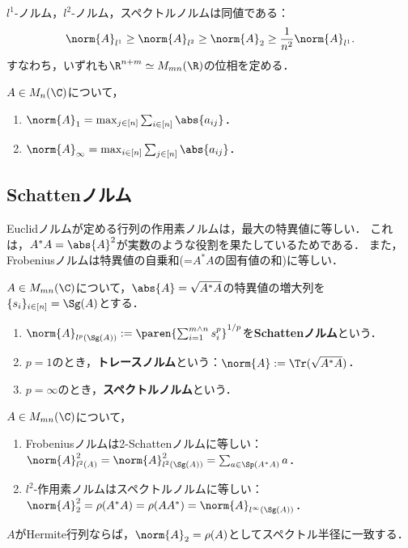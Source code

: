 \documentclass[uplatex, dvipdfmx]{jsreport}
\begin{document}
\begin{proposition}[ノルムの同値性]
    $l^1$-ノルム，$l^2$-ノルム，スペクトルノルムは同値である：
    \[\norm{A}_{l^1}\ge\norm{A}_{l^2}\ge\norm{A}_2\ge\frac{1}{n^2}\norm{A}_{l^1}.\]
    すなわち，いずれも$\R^{n+m}\simeq M_{mn}(\R)$の位相を定める．
\end{proposition}

\begin{proposition}[作用素ノルムの表示]
    $A\in M_n(\C)$について，
    \begin{enumerate}
        \item $\norm{A}_1=\max_{j\in[n]}\sum_{i\in[n]}\abs{a_{ij}}$．
        \item $\norm{A}_\infty=\max_{i\in[n]}\sum_{j\in[n]}\abs{a_{ij}}$．
    \end{enumerate}
\end{proposition}

\subsection{Schattenノルム}

\begin{tcolorbox}[colframe=ForestGreen, colback=ForestGreen!10!white,breakable,colbacktitle=ForestGreen!40!white,coltitle=black,fonttitle=\bfseries\sffamily,
title=]
    Euclidノルムが定める行列の作用素ノルムは，最大の特異値に等しい．
    これは，$A^*A=\abs{A}^2$が実数のような役割を果たしているためである．
    また，Frobeniusノルムは特異値の自乗和(=$A^*A$の固有値の和)に等しい．
\end{tcolorbox}

\begin{definition}
    $A\in M_{mn}(\C)$について，$\abs{A}=\sqrt{A^*A}$の特異値の増大列を$\{s_i\}_{i\in[n]}=\Sg(A)$とする．
    \begin{enumerate}
        \item $\norm{A}_{l^p(\Sg(A))}:=\paren{\sum_{i=1}^{m\land n}s_i^p}^{1/p}$を\textbf{Schattenノルム}という．
        \item $p=1$のとき，\textbf{トレースノルム}という：$\norm{A}:=\Tr(\sqrt{A^*A})$．
        \item $p=\infty$のとき，\textbf{スペクトルノルム}という．
    \end{enumerate}
\end{definition}

\begin{proposition}
    $A\in M_{mn}(\C)$について，
    \begin{enumerate}
        \item Frobeniusノルムは2-Schattenノルムに等しい：$\norm{A}_{l^2(A)}^2=\norm{A}_{l^2(\Sg(A))}^2=\sum_{a\in\Sp(A^*A)}a$．
        \item $l^2$-作用素ノルムはスペクトルノルムに等しい：$\norm{A}_{2}^2=\rho(A^*A)=\rho(AA^*)=\norm{A}_{l^\infty(\Sg(A))}$．
    \end{enumerate}
\end{proposition}
\begin{remarks}
    $A$がHermite行列ならば，$\norm{A}_2=\rho(A)$としてスペクトル半径に一致する．
\end{remarks}
\end{document}
